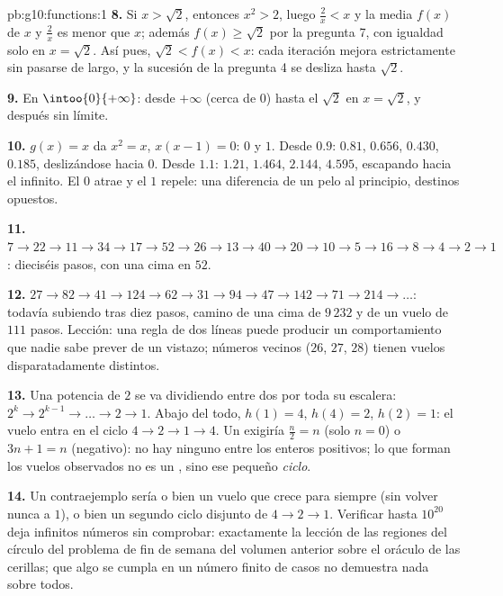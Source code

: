 \begin{solution}{pb:g10:functions:1}
\textbf{8.} Si $x > \sqrt2$, entonces $x^2 > 2$, luego $\frac2x < x$ y la
media $f(x)$ de $x$ y $\frac2x$ es menor que $x$; además
$f(x) \geq \sqrt2$ por la pregunta 7, con igualdad solo en $x = \sqrt2$.
Así pues, $\sqrt2 < f(x) < x$: cada iteración mejora estrictamente sin
pasarse de largo, y la sucesión de la pregunta 4 se desliza hasta
$\sqrt2$.

\textbf{9.} En $\intoo{0}{+\infty}$:  desde $+\infty$ (cerca de
$0$) hasta el  $\sqrt2$ en $x = \sqrt2$, y  después sin
límite.

\textbf{10.} $g(x) = x$ da $x^2 = x$, $x(x - 1) = 0$:  $0$ y
$1$. Desde $0.9$: $0.81$, $0.656$, $0.430$, $0.185$, deslizándose hacia
$0$. Desde $1.1$: $1.21$, $1.464$, $2.144$, $4.595$, escapando hacia el
infinito. El  $0$ atrae y el $1$ repele: una diferencia de un
pelo al principio, destinos opuestos.

\textbf{11.} $7 \to 22 \to 11 \to 34 \to 17 \to 52 \to 26 \to
13 \to 40 \to 20 \to 10 \to 5 \to 16 \to 8 \to 4 \to 2 \to 1$: dieciséis
pasos, con una cima en $52$.

\textbf{12.} $27 \to 82 \to 41 \to 124 \to 62 \to 31 \to 94 \to
47 \to 142 \to 71 \to 214 \to \dots$: todavía subiendo tras diez pasos,
camino de una cima de $9\,232$ y de un vuelo de $111$ pasos. Lección: una
regla de dos líneas puede producir un comportamiento que nadie sabe
prever de un vistazo; números vecinos ($26$, $27$, $28$) tienen vuelos
disparatadamente distintos.

\textbf{13.} Una potencia de $2$ se va dividiendo entre dos por toda su
escalera: $2^k \to 2^{k-1} \to \dots \to 2 \to 1$. Abajo del todo,
$h(1) = 4$, $h(4) = 2$, $h(2) = 1$: el vuelo entra en el ciclo
$4 \to 2 \to 1 \to 4$. Un  exigiría $\frac n2 = n$ (solo
$n = 0$) o $3n + 1 = n$ (negativo): no hay ninguno entre los enteros
positivos; lo que forman los vuelos observados no es un , sino
ese pequeño \emph{ciclo}.

\textbf{14.} Un contraejemplo sería o bien un vuelo que crece para
siempre (sin volver nunca a $1$), o bien un segundo ciclo disjunto de
$4 \to 2 \to 1$. Verificar hasta $10^{20}$ deja infinitos números sin
comprobar: exactamente la lección de las regiones del círculo del problema
de fin de semana del volumen anterior sobre el oráculo de las cerillas;
que algo se cumpla en un número finito de casos no demuestra nada sobre
todos.


\end{solution}
